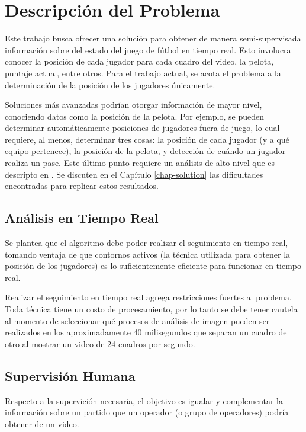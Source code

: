 \chapter{Descripción del Problema}
\label{chap-problems}

Este trabajo busca ofrecer una solución para obtener de manera semi-supervisada
información sobre del estado del juego de fútbol en tiempo real. Esto involucra
conocer la posición de cada jugador para cada cuadro del video, la pelota,
puntaje actual, entre otros. Para el trabajo actual, se acota el problema a la
determinación de la posición de los jugadores únicamente.

Soluciones más avanzadas podrían otorgar información de mayor nivel,
conociendo datos como la posición de la pelota. Por ejemplo, se pueden
determinar automáticamente posiciones de jugadores fuera de juego, lo cual
requiere, al menos, determinar tres cosas: la posición de cada jugador (y a qué
equipo pertenece), la posición de la pelota, y detección de cuándo un jugador
realiza un pase. Este último punto requiere un análisis de alto nivel que es
descripto en \cite{papers-tanos}. Se discuten en el Capítulo \ref{chap-solution}
las dificultades encontradas para replicar estos resultados.

\section{Análisis en Tiempo Real}

Se plantea que el algoritmo debe poder realizar el seguimiento en tiempo
real, tomando ventaja de que contornos activos (la técnica utilizada para
obtener la posición de los jugadores) es lo suficientemente eficiente para
funcionar en tiempo real.

Realizar el seguimiento en tiempo real agrega restricciones fuertes al
problema. Toda técnica tiene un costo de procesamiento, por lo tanto se debe
tener cautela al momento de seleccionar qué procesos de análisis de imagen
pueden ser realizados en los aproximadamente 40 milisegundos que separan un
cuadro de otro al mostrar un video de 24 cuadros por segundo.

\section{Supervisión Humana}

Respecto a la supervición necesaria, el objetivo es igualar y complementar la
información sobre un partido que un operador (o grupo de operadores) podría
obtener de un video.

